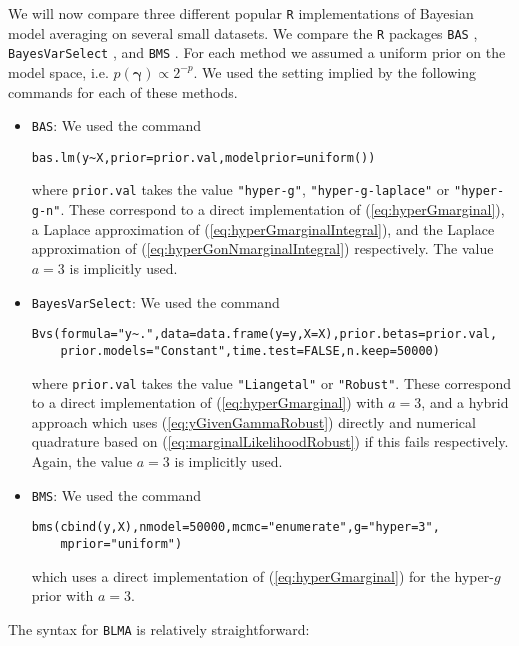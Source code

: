 \documentclass[12pt]{article}
\def\vectorfonttwo{\boldsymbol}
\def\vgamma{{\vectorfonttwo \gamma}}             %
\begin{document}
We will now compare three different popular {\tt R} implementations of Bayesian model averaging on 
several small datasets. We compare the {\tt R} packages {\tt BAS} \citep{Clyde2017}, 
{\tt BayesVarSelect} \citep{Garcia-Donato2016}, and  {\tt BMS} \citep{Zeugner2015}. For each method
we assumed a uniform prior on the model space, i.e. $p(\vgamma)\propto 2^{-p}$. We used the
setting implied by the following commands for each of these methods.
\begin{itemize}
	\item {\tt BAS}: We used the command
\begin{verbatim}
bas.lm(y~X,prior=prior.val,modelprior=uniform())
\end{verbatim}

	where \verb|prior.val| takes the value \verb|"hyper-g"|, \verb|"hyper-g-laplace"| or \verb|"hyper-g-n"|.
	These correspond to a direct implementation of (\ref{eq:hyperGmarginal}),
	a Laplace approximation of (\ref{eq:hyperGmarginalIntegral}), and the 
	Laplace approximation of (\ref{eq:hyperGonNmarginalIntegral}) respectively. The
	value $a=3$ is implicitly used.
	
	\item {\tt BayesVarSelect}: We used the command
\begin{verbatim}
Bvs(formula="y~.",data=data.frame(y=y,X=X),prior.betas=prior.val,
    prior.models="Constant",time.test=FALSE,n.keep=50000)
\end{verbatim}

    
\noindent where \verb|prior.val| takes the value \verb|"Liangetal"| or \verb|"Robust"|.
These 
correspond to a direct implementation of (\ref{eq:hyperGmarginal}) with $a=3$, and a hybrid approach which
uses (\ref{eq:yGivenGammaRobust}) directly and numerical quadrature based on (\ref{eq:marginalLikelihoodRobust}) if this fails respectively. 
Again, the value
$a=3$ is implicitly used.

\item {\tt BMS}: We used the command
\begin{verbatim}
bms(cbind(y,X),nmodel=50000,mcmc="enumerate",g="hyper=3",
    mprior="uniform")	
\end{verbatim}

\noindent which uses a direct implementation of (\ref{eq:hyperGmarginal}) for the hyper-$g$
prior with $a=3$.
\end{itemize}

\noindent 
The syntax for {\tt BLMA} is relatively straightforward:
\end{document}
